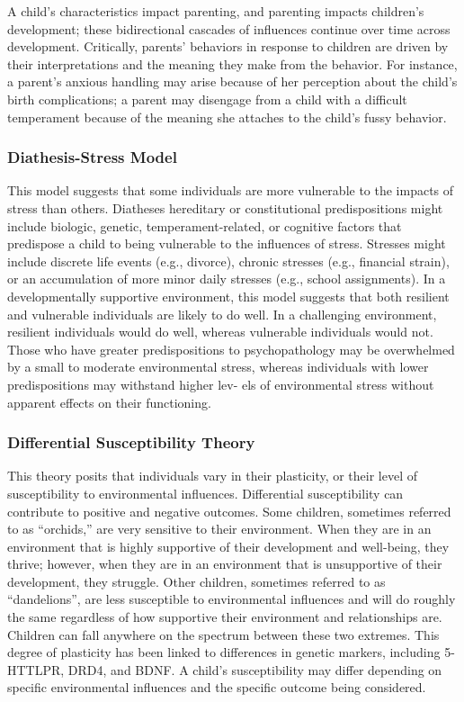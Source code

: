 A child’s characteristics impact parenting, and parenting impacts children’s
development; these bidirectional cascades of influences continue over time
across development. Critically, parents’ behaviors in response to children are
driven by their interpretations and the meaning they make from the behavior.
For instance, a parent’s anxious handling may arise because of her perception
about the child’s birth complications; a parent may disengage from a child with
a difficult temperament because of the meaning she attaches to the child’s
fussy behavior.
\cite{Sameroff2009}

\subsubsection{Diathesis-Stress Model}
This model suggests that some individuals are more vulnerable to the impacts of
stress than others. Diatheses hereditary or constitutional predispositions
might include biologic, genetic, temperament-related, or cognitive factors that
predispose a child to being vulnerable to the influences of stress. Stresses
might include discrete life events (e.g., divorce), chronic stresses
(e.g., financial strain), or an accumulation of more minor daily stresses
(e.g., school assignments). In a developmentally supportive environment, this
model suggests that both resilient and vulnerable individuals are likely to do
well. In a challenging environment, resilient individuals would do well,
whereas vulnerable individuals would not. Those who have greater
predispositions to psychopathology may be overwhelmed by a small to moderate
environmental stress, whereas individuals with lower predispositions may
withstand higher lev- els of environmental stress without apparent effects on
their functioning.
\cite{Feldman3}

\subsubsection{Differential Susceptibility Theory}
This theory posits that individuals vary in their plasticity, or their level of
susceptibility to environmental influences. \cite{Belsky2021} Differential
susceptibility can contribute to positive and negative outcomes. Some children,
sometimes referred to as “orchids,” are very sensitive to their environment.
When they are in an environment that is highly supportive of their development
and well-being, they thrive; however, when they are in an environment that is
unsupportive of their development, they struggle. Other children, sometimes
referred to as “dandelions”, are less susceptible to environmental influences
and will do roughly the same regardless of how supportive their environment and
relationships are. Children can fall anywhere on the spectrum between these two
extremes. This degree of plasticity has been linked to differences in genetic
markers, including 5-HTTLPR, DRD4, and BDNF. \cite{Belsky2021} A child’s
susceptibility may differ depending on specific environmental influences and
the specific outcome being considered.
\cite{Feldman3}

